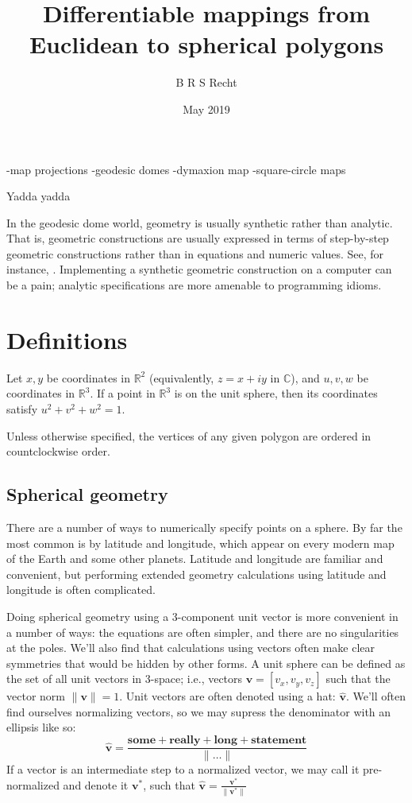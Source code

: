 \documentclass{amsart}[12pt]
\title{Differentiable mappings from Euclidean to spherical polygons}
\author{B R S Recht}
\date{May 2019}
\begin{document}
\maketitle

-map projections
-geodesic domes
-dymaxion map
-square-circle maps

Yadda yadda\cite{kahn}

In the geodesic dome world, geometry is usually synthetic rather than
analytic. That is, geometric constructions are usually expressed in terms of
step-by-step geometric constructions rather than in equations and numeric
values. See, for instance, \cite{kenner}. Implementing a synthetic geometric
construction on a computer can be a pain; analytic specifications are more
amenable to programming idioms.

\section{Definitions}
Let $x,y$ be coordinates in $\mathbb{R}^2$ (equivalently, $z = x + i y$ in
$\mathbb{C}$), and $u,v,w$ be coordinates in $\mathbb{R}^3$.
If a point in $\mathbb{R}^3$ is on the unit sphere,
then its coordinates satisfy $u^2 + v^2 + w^2 = 1$.

Unless otherwise specified, the vertices of any given polygon are ordered in
countclockwise order.

\subsection{Spherical geometry}
There are a number of ways to numerically specify points on a sphere. By far
the most common is by latitude and longitude, which appear on every modern map
of the Earth and some other planets. Latitude and longitude are
familiar and convenient, but performing extended geometry calculations using
latitude and longitude is often complicated.

Doing spherical geometry using a 3-component unit vector is more convenient
in a number of ways: the equations are often simpler, and there are no
singularities at the poles. We'll also find that calculations using vectors
often make clear symmetries that would be hidden by other forms. A unit sphere
can be defined as the set of all unit
vectors in 3-space; i.e., vectors $\mathbf v = [v_x, v_y, v_z]$ such that the
vector norm $\|\mathbf v \|=1$. Unit vectors are often denoted using a hat:
$\hat{\mathbf v}$. We'll often find ourselves normalizing vectors,
so we may supress the denominator with an ellipsis like so:
\begin{equation}
  \hat{\mathbf v} = \frac{\mathbf{some+really+long+statement}}{\|\dots\|}
\end{equation}
If a vector is an intermediate step to a normalized vector,
we may call it pre-normalized and denote it ${\mathbf v}^*$,
such that $\hat{\mathbf v} = \frac{{\mathbf v}^*}{ \|{\mathbf v}^*\|}$
\end{document}

